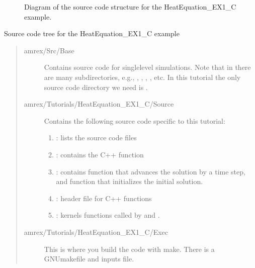 \documentclass[letterpaper,10pt,english]{sphinxmanual}
\begin{document}
\begin{center}

\begin{figure}[htbp]
\centering
\capstart

\noindent{}
\caption{Diagram of the source code structure for the HeatEquation\_EX1\_C example.}\label{\detokenize{Basics:id6}}\label{\detokenize{Basics:fig-basics-heat-flowchart}}\end{figure}

\end{center}

\sphinxAtStartPar
Source code tree for the HeatEquation\_EX1\_C example
\begin{quote}
\begin{description}
\item[{amrex/Src/Base}] \leavevmode
\sphinxAtStartPar
Contains source code for single\sphinxhyphen{}level simulations.  Note that in
 there are many sub\sphinxhyphen{}directories, e.g., , ,
, , etc.  In this tutorial the only source
code directory we need is .

\item[{amrex/Tutorials/HeatEquation\_EX1\_C/Source}] \leavevmode
\sphinxAtStartPar
Contains the following source code specific to this tutorial:
\begin{enumerate}
%
\item {} 
\sphinxAtStartPar
{}: lists the source code files

\item {} 
\sphinxAtStartPar
{}: contains the C++  function

\item {} 
\sphinxAtStartPar
{}: contains function  that advances
the solution by a time step, and function  that
initializes the initial solution.

\item {} 
\sphinxAtStartPar
{}: header file for C++ functions

\item {} 
\sphinxAtStartPar
{}: kernels functions called by  and .

\end{enumerate}

\item[{amrex/Tutorials/HeatEquation\_EX1\_C/Exec}] \leavevmode
\sphinxAtStartPar
This is where you build the code with make.  There is a GNUmakefile
and inputs file.

\end{description}
\end{quote}
\end{document}
